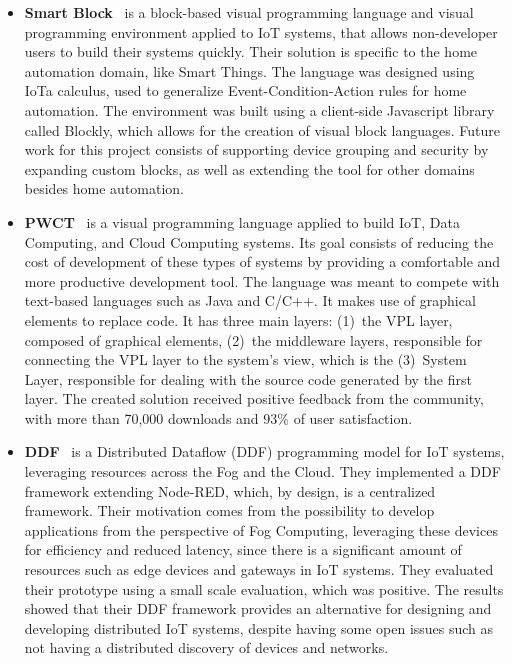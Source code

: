 \begin{itemize}
\item\textbf{Smart Block}~\cite{smart_block} is a block-based visual programming language and visual programming environment applied to IoT systems, that allows non-developer users to build their systems quickly. Their solution is specific to the home automation domain, like Smart Things. The language was designed using IoTa calculus, used to generalize Event-Condition-Action rules for home automation. The environment was built using a client-side Javascript library called Blockly, which allows for the creation of visual block languages. Future work for this project consists of supporting device grouping and security by expanding custom blocks, as well as extending the tool for other domains besides home automation.

\item\textbf{PWCT}~\cite{pwct} is a visual programming language applied to build IoT, Data Computing, and Cloud Computing systems. Its goal consists of reducing the cost of development of these types of systems by providing a comfortable and more productive development tool. The language was meant to compete with text-based languages such as Java and C/C++. It makes use of graphical elements to replace code. It has three main layers: (1)~the VPL layer, composed of graphical elements, (2)~the middleware layers, responsible for connecting the VPL layer to the system's view, which is the (3)~System Layer, responsible for dealing with the source code generated by the first layer. The created solution received positive feedback from the community, with more than 70,000 downloads and 93\% of user satisfaction.

\item\textbf{DDF}~\cite{ddf} is a Distributed Dataflow (DDF) programming model for IoT systems, leveraging resources across the Fog and the Cloud. They implemented a DDF framework extending Node-RED, which, by design, is a centralized framework. Their motivation comes from the possibility to develop applications from the perspective of Fog Computing, leveraging these devices for efficiency and reduced latency, since there is a significant amount of resources such as edge devices and gateways in IoT systems. They evaluated their prototype using a small scale evaluation, which was positive. The results showed that their DDF framework provides an alternative for designing and developing distributed IoT systems, despite having some open issues such as not having a distributed discovery of devices and networks.


\end{itemize}
